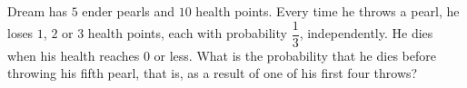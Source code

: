 Dream has $5$ ender pearls and $10$ health points. Every time he throws a pearl, he loses $1$, $2$ or $3$ health points, each with probability $\dfrac13$, independently. He dies when his health reaches $0$ or less. What is the probability that he dies before throwing his fifth pearl, that is, as a result of one of his first four throws?
